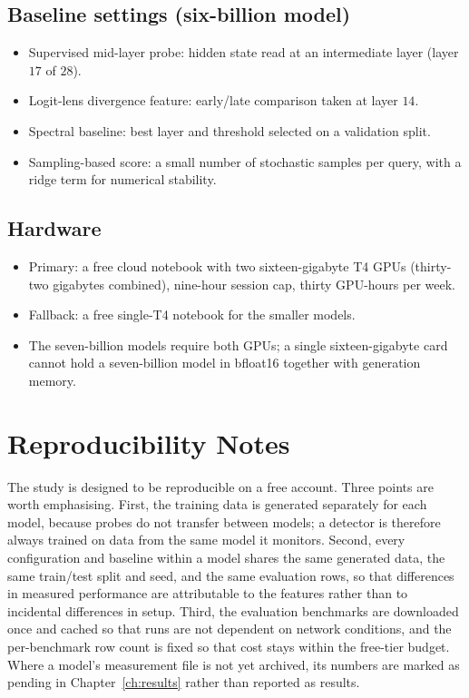 \section*{Baseline settings (six-billion model)}
\begin{itemize}[leftmargin=1.6em,itemsep=0.2em]
\item Supervised mid-layer probe: hidden state read at an intermediate layer (layer $17$ of
$28$).
\item Logit-lens divergence feature: early/late comparison taken at layer $14$.
\item Spectral baseline: best layer and threshold selected on a validation split.
\item Sampling-based score: a small number of stochastic samples per query, with a ridge
term for numerical stability.
\end{itemize}

\section*{Hardware}
\begin{itemize}[leftmargin=1.6em,itemsep=0.2em]
\item Primary: a free cloud notebook with two sixteen-gigabyte T4 GPUs (thirty-two gigabytes
combined), nine-hour session cap, thirty GPU-hours per week.
\item Fallback: a free single-T4 notebook for the smaller models.
\item The seven-billion models require both GPUs; a single sixteen-gigabyte card cannot hold
a seven-billion model in bfloat16 together with generation memory.
\end{itemize}

\chapter{Reproducibility Notes}
\label{app:repro}

The study is designed to be reproducible on a free account. Three points are worth
emphasising. First, the training data is generated separately for each model, because probes
do not transfer between models; a detector is therefore always trained on data from the same
model it monitors. Second, every configuration and baseline within a model shares the same
generated data, the same train/test split and seed, and the same evaluation rows, so that
differences in measured performance are attributable to the features rather than to incidental
differences in setup. Third, the evaluation benchmarks are downloaded once and cached so that
runs are not dependent on network conditions, and the per-benchmark row count is fixed so that
cost stays within the free-tier budget. Where a model's measurement file is not yet archived,
its numbers are marked as pending in Chapter~\ref{ch:results} rather than reported as results.
